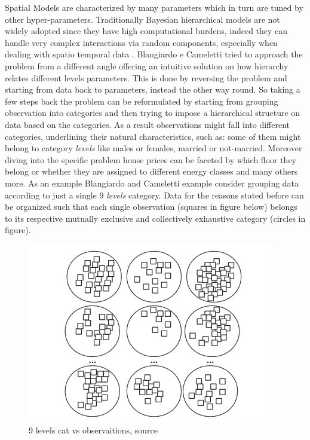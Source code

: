 \documentclass[
  12pt,
  a4paper,
  oneside]{book}
\theoremstyle{definition}
\theoremstyle{definition}
\theoremstyle{definition}
\theoremstyle{remark}
\begin{document}
Spatial Models are characterized by many parameters which in turn are tuned by other hyper-parameters. Traditionally Bayesian hierarchical models are not widely adopted since they have high computational burdens, indeed they can handle very complex interactions via random components, especially when dealing with spatio temporal data \citet{Ling}. Blangiardo e Cameletti \citeyearpar{Blangiardo-Cameletti} tried to approach the problem from a different angle offering an intuitive solution on how hierarchy relates different levels parameters. This is done by reversing the problem and starting from data back to parameters, instead the other way round. So taking a few steps back the problem can be reformulated by starting from grouping observation into categories and then trying to impose a hierarchical structure on data based on the categories. As a result observations might fall into different categories, underlining their natural characteristics, such as: some of them might belong to category \emph{levels} like males or females, married or not-married. Moreover diving into the specific problem house prices can be faceted by which floor they belong or whether they are assigned to different energy classes and many others more. As an example Blangiardo and Cameletti example consider grouping data according to just a single 9 \emph{levels} category. Data for the reasons stated before can be organized such that each single observation (squares in figure below) belongs to its respective mutually exclusive and collectively exhaustive category (circles in figure).

\begin{figure}
\centering
\includegraphics{images/simple.PNG}
\caption{9 levels cat vs observaitions, source \citet{Blangiardo-Cameletti}}
\end{figure}
\end{document}
